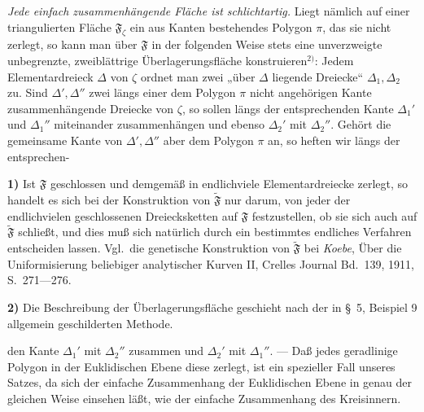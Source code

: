 \documentclass{article}
\begin{document}
\emph{Jede einfach zusammenhängende Fläche ist schlichtartig.} Liegt nämlich auf einer triangulierten Fläche $\mathfrak{F}_\zeta$ ein aus Kanten bestehendes Polygon $\pi$, das sie nicht zerlegt, so kann man über $\mathfrak{F}$ in der folgenden Weise stets eine unverzweigte unbegrenzte, zweiblättrige Überlagerungsfläche konstruieren${}^{2)}$: Jedem Elementardreieck $\Delta$ von $\zeta$ ordnet man zwei „über $\Delta$ liegende Dreiecke“ $\Delta_1, \Delta_2$ zu. Sind $\Delta', \Delta''$ zwei längs einer dem Polygon $\pi$ nicht angehörigen Kante zusammenhängende Dreiecke von $\zeta$, so sollen längs der entsprechenden Kante $\Delta_1'$ und $\Delta_1''$ miteinander zusammenhängen und ebenso $\Delta_2'$ mit $\Delta_2''$. Gehört die gemeinsame Kante von $\Delta', \Delta''$ aber dem Polygon $\pi$ an, so heften wir längs der entsprechen-

\textbf{1)} Ist $\mathfrak{F}$ geschlossen und demgemäß in endlichviele Elementardreiecke zerlegt, so handelt es sich bei der Konstruktion von $\tilde{\mathfrak{F}}$ nur darum, von jeder der endlichvielen geschlossenen Dreiecksketten auf $\mathfrak{F}$ festzustellen, ob sie sich auch auf $\tilde{\mathfrak{F}}$ schließt, und dies muß sich natürlich durch ein bestimmtes endliches Verfahren entscheiden lassen. Vgl.\ die genetische Konstruktion von $\tilde{\mathfrak{F}}$ bei \emph{Koebe}, Über die Uniformisierung beliebiger analytischer Kurven II, Crelles Journal Bd.\ 139, 1911, S.\ 271---276.

\textbf{2)} Die Beschreibung der Überlagerungsfläche geschieht nach der in §~5, Beispiel 9 allgemein geschilderten Methode.

den Kante $\Delta_1'$ mit $\Delta_2''$ zusammen und $\Delta_2'$ mit $\Delta_1''$. --- Daß jedes geradlinige Polygon in der Euklidischen Ebene diese zerlegt, ist ein spezieller Fall unseres Satzes, da sich der einfache Zusammenhang der Euklidischen Ebene in genau der gleichen Weise einsehen läßt, wie der einfache Zusammenhang des Kreisinnern.
\end{document}
